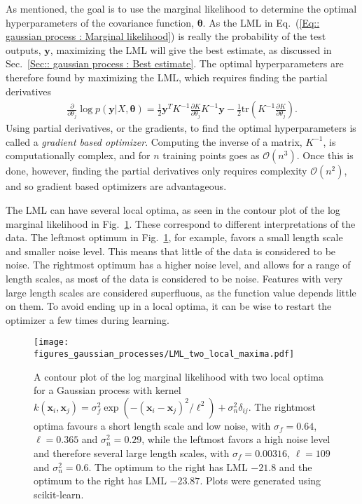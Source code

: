 \documentclass[twoside,english]{uiofysmaster}
\begin{document}
As mentioned, the goal is to use the marginal likelihood to determine the optimal hyperparameters of the covariance function, $\boldsymbol{\theta}$. As the LML in Eq.~(\ref{Eq:: gaussian process : Marginal likelihood}) is really the probability of the test outputs, $\textbf{y}$, maximizing the LML will give the best estimate, as discussed in Sec.~\ref{Sec:: gaussian process : Best estimate}. The optimal hyperparameters are therefore found by maximizing the LML, which requires finding the partial derivatives 
\begin{align}
\frac{\partial}{\partial \theta_j}
 \log p(\textbf{y}|X, \boldsymbol{\theta}) = \frac{1}{2} \textbf{y}^T K^{-1} \frac{\partial K}{\partial \theta_j} K^{-1} \textbf{y} - \frac{1}{2} \text{tr} (K^{-1} \frac{\partial K}{\partial \theta_j}).
\end{align}
Using partial derivatives, or the gradients, to find the optimal hyperparameters is called a \textit{gradient based optimizer}. Computing the inverse of a matrix, $K^{-1}$, is computationally complex, and for $n$ training points goes as $\mathcal{O}(n^3)$. Once this is done, however, finding the partial derivatives only requires complexity $\mathcal{O}(n^2)$, and so gradient based optimizers are advantageous.

The LML can have several local optima, as seen in the contour plot of the log marginal likelihood in Fig.~\ref{Fig:: gaussian process : LML several local optima}. These correspond to different interpretations of the data. The leftmost optimum in Fig.~\ref{Fig:: gaussian process : LML several local optima}, for example, favors a small length scale and smaller noise level. This means that little of the data is considered to be noise. The rightmost optimum has a higher noise level, and allows for a range of length scales, as most of the data is considered to be noise. Features with very large length scales are considered superfluous, as the function value depends little on them. To avoid ending up in a local optima, it can be wise to restart the optimizer a few times during learning.

\begin{figure}
\centering
\texttt{[image: figures\_gaussian\_processes/LML\_two\_local\_maxima.pdf]}
\caption{A contour plot of the log marginal likelihood with two local optima for a Gaussian process with kernel $k(\textbf{x}_i, \textbf{x}_j) = \sigma_f^2 \exp(- (\textbf{x}_i - \textbf{x}_j)^2 / \ell^2) + \sigma_n^2 \delta_{ij}$. The rightmost optima favours a short length scale and low noise, with $\sigma_f = 0.64$, $\ell = 0.365$ and $\sigma^2_n = 0.29$, while the leftmost favors a high noise level and therefore several large length scales, with $\sigma_f = 0.00316$, $\ell = 109$ and $\sigma^2_n = 0.6$. The optimum to the right has LML $-21.8$ and the optimum to the right has LML $-23.87$. Plots were generated using scikit-learn.}
\label{Fig:: gaussian process : LML several local optima}
\end{figure}
\end{document}

